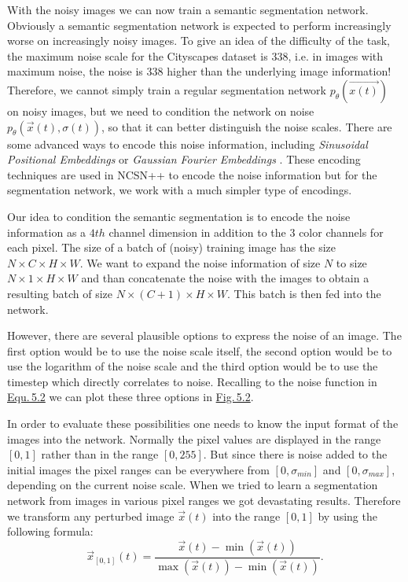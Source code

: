 With the noisy images we can now train a semantic segmentation network. Obviously a semantic segmentation network is expected to perform increasingly worse on increasingly noisy images. To give an idea of the difficulty of the task, the maximum noise scale for the Cityscapes dataset is $338$, i.e. in images with maximum noise, the noise is $338$ higher than the underlying image information! Therefore, we cannot simply train a regular segmentation network $p_\theta(\vec{x(t)})$ on noisy images, but we need to condition the network on noise $p_\theta(\vec{x}(t), \sigma(t))$, so that it can better distinguish the noise scales. There are some advanced ways to encode this noise information, including \textit{Sinusoidal Positional Embeddings} \cite{attention} or \textit{Gaussian Fourier Embeddings} \cite{fourfeat}. These encoding techniques are used in NCSN++ to encode the noise information but for the segmentation network, we work with a much simpler type of encodings.

Our idea to condition the semantic segmentation is to encode the noise information as a $4th$ channel dimension in addition to the $3$ color channels for each pixel. The size of a batch of (noisy) training image has the size $N\times C\times H\times W$. We want to expand the noise information of size $N$ to size $N\times 1\times H\times W$ and than concatenate the noise with the images to obtain a resulting batch of size $N\times (C+1)\times H\times W$. This batch is then fed into the network.

However, there are several plausible options to express the noise of an image. The first option would be to use the noise scale itself, the second option would be to use the logarithm of the noise scale and the third option would be to use the timestep which directly correlates to noise. Recalling to the noise function in \hyperref[equ:5.2]{Equ.\,5.2} we can plot these three options in \hyperref[fig:5.2]{Fig.\,5.2}.

In order to evaluate these possibilities one needs to know the input format of the images into the network. Normally the pixel values are displayed in the range $[0, 1]$ rather than in the range $[0, 255]$. But since there is noise added to the initial images the pixel ranges can be everywhere from $[0,\sigma_{min}]$ and $[0, \sigma_{max}]$, depending on the current noise scale. When we tried to learn a segmentation network from images in various pixel ranges we got devastating results. Therefore we transform any perturbed image $\vec{x}(t)$ into the range $[0, 1]$ by using the following formula:
%
\begin{equation}
    \vec{x}_{[0,1]}(t)=\frac{\vec{x}(t)-\min(\vec{x}(t))}{\max(\vec{x}(t))-\min(\vec{x}(t))}.
\end{equation}
%

